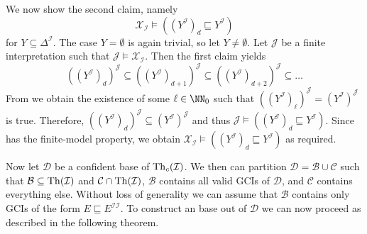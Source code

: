 \begin{Proof}
  We now show the second claim, namely
  \begin{equation*}
    \mathcal{X}_{\mathcal{I}} \models ((Y^{\mathcal{I}})_d \sqsubseteq Y^{\mathcal{I}})
  \end{equation*}
  for $Y \subseteq \Delta^{\mathcal{I}}$.  The case $Y = \emptyset$ is again trivial, so
  let $Y \neq \emptyset$.  Let $\mathcal{J}$ be a finite interpretation such that
  $\mathcal{J} \models \mathcal{X}_{\mathcal{I}}$.  Then the first claim yields
  \begin{equation*}
    ((Y^{\mathcal{I}})_d)^{\mathcal{J}} \subseteq ((Y^{\mathcal{I}})_{d+1})^{\mathcal{J}}
    \subseteq ((Y^{\mathcal{I}})_{d+2})^{\mathcal{J}} \subseteq \dots
  \end{equation*}
  From  we obtain the existence of some $\ell \in \NN_0$ such
  that $((Y^{\mathcal{I}})_\ell)^{\mathcal{J}} = (Y^{\mathcal{I}})^{\mathcal{J}}$ is true.
  Therefore, $((Y^{\mathcal{I}})_d)^{\mathcal{J}} \subseteq
  (Y^{\mathcal{I}})^{\mathcal{J}}$ and thus $\mathcal{J} \models ((Y^{\mathcal{I}})_d
  \sqsubseteq Y^{\mathcal{I}})$.  Since \ELbot has the finite-model property, we obtain
  $\mathcal{X}_{\mathcal{I}} \models ((Y^{\mathcal{I}})_d \sqsubseteq Y^{\mathcal{I}})$ as
  required.
\end{Proof}

Now let $\mathcal{D}$ be a confident base of $\operatorname{Th}_c(\mathcal{I})$.  We then can partition
$\mathcal{D} = \mathcal{B} \cup \mathcal{C}$ such that $\mathcal{B} \subseteq
\operatorname{Th}(\mathcal{I})$ and $\mathcal{C} \cap \operatorname{Th}(\mathcal{I})$, \ie $\mathcal{B}$ contains all
valid GCIs of $\mathcal{D}$, and $\mathcal{C}$ contains everything else.  Without loss of
generality we can assume that $\mathcal{B}$ contains only GCIs of the form $E \sqsubseteq
E^{\mathcal{I}\mathcal{I}}$.  To construct an \ELbot base out of $\mathcal{D}$ we can now
proceed as described in the following theorem.

